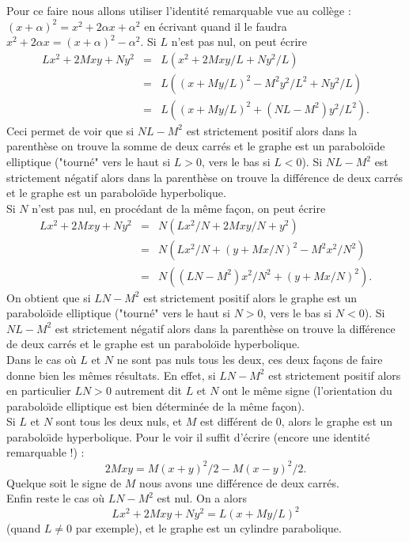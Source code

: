 \documentclass[class=report,crop=false]{standalone}
\begin{document}
Pour ce faire nous allons utiliser l'identité remarquable vue au coll\`ege : $(x+\alpha)^2=x^2+2\alpha x+\alpha^2$ en écrivant quand il le faudra $x^2+2\alpha x=(x+\alpha)^2-\alpha^2$.
Si $L$ n'est pas nul, on peut écrire 
\begin{eqnarray*}
Lx^2 + 2Mxy + Ny^2&=&L(x^2 + 2Mxy/L + Ny^2/L)\\
&=&L((x+ My/L)^2- M^2y^2/L^2+ Ny^2/L)\\
&=&L((x+ My/L)^2 + (NL-M^2)y^2/L^2).
\end{eqnarray*}
Ceci permet de voir que si $NL-M^2$ est strictement positif alors dans la parenth\`ese on trouve la somme de deux carrés et le graphe est un parabolo\"\i de elliptique ("tourné" vers le haut si $L>0$, vers le bas si $L<0$). Si $NL-M^2$ est strictement négatif alors dans la parenth\`ese on trouve la différence de deux carrés et le graphe est un parabolo\"\i de hyperbolique.\\
Si $N$ n'est pas nul, en procédant de la m\^eme fa\c con, on peut écrire 
\begin{eqnarray*}
Lx^2 + 2Mxy + Ny^2&=&N(Lx^2/N + 2Mxy/N + y^2)\\
&=&N(Lx^2/N+ (y+Mx/N)^2-M^2x^2/N^2)\\
&=&N((LN-M^2)x^2/N^2+(y+Mx/N)^2).
\end{eqnarray*}
On obtient que si $LN-M^2$ est strictement positif alors le graphe est un parabolo\"\i de elliptique ("tourné" vers le haut si $N>0$, vers le bas si $N<0$). Si $NL-M^2$ est strictement négatif alors dans la parenth\`ese on trouve la différence de deux carrés et le graphe est un parabolo\"\i de hyperbolique.\\
Dans le cas o\`u  $L$ et $N$ ne sont pas nuls tous les deux, ces deux fa\c cons de faire donne bien les m\^emes résultats. En effet, si $LN-M^2$ est strictement positif alors en particulier $LN>0$ autrement dit $L$ et $N$ ont le m\^eme signe (l'orientation du parabolo\"\i de elliptique est bien déterminée de la m\^eme fa\c con).\\
Si $L$ et $N$ sont tous les deux nuls, et $M$ est différent de 0, alors le graphe est un parabolo\"\i de hyperbolique. Pour le voir il suffit d'écrire (encore une identité remarquable !) :
$$
2Mxy=M(x+y)^2/2-M(x-y)^2/2.
$$
Quelque soit le signe de $M$ nous avons une différence de deux carrés. \\
Enfin reste le cas o\`u $LN-M^2$ est nul. On a alors 
$$
Lx^2 + 2Mxy + Ny^2=L(x+ My/L)^2 
$$
(quand $L\neq 0$ par exemple), et le graphe est un cylindre parabolique.
\end{document}
